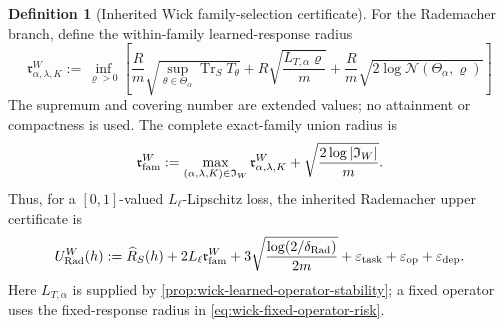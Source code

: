 \documentclass[11pt]{article}
\numberwithin{section}{part}
\theoremstyle{plain}
\theoremstyle{definition}
\newtheorem{definition}[definition]{Definition}
\theoremstyle{remark}
\begin{document}
\begin{definition}[Inherited Wick family-selection certificate]
For the Rademacher branch, define the within-family learned-response radius
\begin{equation}
 \label{eq:wick-inherited-learned-rademacher-radius}
 \mathfrak r_{\alpha,\lambda,K}^W
 :=\inf_{\varrho>0}\left[
 \frac Rm\sqrt{\sup_{\theta\in\Theta_\alpha}
                    \operatorname{Tr}_S T_\theta}
 +R\sqrt{\frac{L_{T,\alpha}\varrho}{m}}
 +\frac Rm\sqrt{2\log\mathcal N(\Theta_\alpha,\varrho)}
 \right]
\end{equation}
The supremum and covering number are extended values; no attainment or
compactness is used.  The complete exact-family union radius is
\begin{equation}
 \label{eq:wick-inherited-source-union-radius}
 \mathfrak r_{\rm fam}^W
 :=\max_{(\alpha,\lambda,K)\in\mathfrak I_W}
       \mathfrak r_{\alpha,\lambda,K}^W
 +\sqrt{\frac{2\log|\mathfrak I_W|}{m}}.
\end{equation}
Thus, for a \([0,1]\)-valued \(L_\ell\)-Lipschitz loss, the inherited
Rademacher upper certificate is
\begin{equation}
 \label{eq:wick-inherited-rademacher-ucb}
 U_{\rm Rad}^W(h)
 :=\widehat R_S(h)+2L_\ell\mathfrak r_{\rm fam}^W
 +3\sqrt{\frac{\log(2/\delta_{\rm Rad})}{2m}}
 +\varepsilon_{\rm task}+\varepsilon_{\rm op}
 +\varepsilon_{\rm dep}.
\end{equation}
Here \(L_{T,\alpha}\) is supplied by
\cref{prop:wick-learned-operator-stability}; a fixed operator uses the
fixed-response radius in \eqref{eq:wick-fixed-operator-risk}.


\end{definition}
\end{document}
